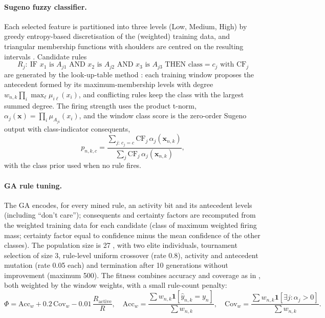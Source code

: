 \paragraph{Sugeno fuzzy classifier.} Each selected feature is partitioned into three levels (Low, Medium, High) by greedy entropy-based discretisation of the (weighted) training data, and triangular membership functions with shoulders are centred on the resulting intervals \cite{FarhadiSedehi2024a}. Candidate rules
\begin{equation}
R_j:\ \text{IF } x_1 \text{ is } A_{j1} \text{ AND } x_2 \text{ is } A_{j2} \text{ AND } x_3 \text{ is } A_{j3} \text{ THEN class} = c_j \text{ with } \mathrm{CF}_j
\end{equation}
are generated by the look-up-table method \cite{WangMendel1992}: each training window proposes the antecedent formed by its maximum-membership levels with degree $w_{n,k}\prod_i\max_\ell\mu_{i\ell}(x_i)$, and conflicting rules keep the class with the largest summed degree. The firing strength uses the product t-norm, $\alpha_j(\mathbf{x})=\prod_{i}\mu_{A_{ji}}(x_i)$, and the window class score is the zero-order Sugeno output with class-indicator consequents,
\begin{equation}
p_{n,k,c} = \frac{\sum_{j:\,c_j=c}\mathrm{CF}_j\,\alpha_j(\mathbf{x}_{n,k})}{\sum_{j}\mathrm{CF}_j\,\alpha_j(\mathbf{x}_{n,k})},
\label{eq:score}
\end{equation}
with the class prior used when no rule fires.

\paragraph{GA rule tuning.} The GA encodes, for every mined rule, an activity bit and its antecedent levels (including ``don't care''); consequents and certainty factors are recomputed from the weighted training data for each candidate (class of maximum weighted firing mass; certainty factor equal to confidence minus the mean confidence of the other classes). The population size is 27 \cite{FarhadiSedehi2024a}, with two elite individuals, tournament selection of size 3, rule-level uniform crossover (rate 0.8), activity and antecedent mutation (rate 0.05 each) and termination after 10 generations without improvement (maximum 500). The fitness combines accuracy and coverage as in \cite{FarhadiSedehi2024a}, both weighted by the window weights, with a small rule-count penalty:
\begin{equation}
\Phi = \mathrm{Acc}_w + 0.2\,\mathrm{Cov}_w - 0.01\,\frac{R_{\mathrm{active}}}{R},\quad
\mathrm{Acc}_w = \frac{\sum w_{n,k}\mathbf{1}[\hat y_{n,k}=y_n]}{\sum w_{n,k}},\quad
\mathrm{Cov}_w = \frac{\sum w_{n,k}\mathbf{1}[\exists j:\alpha_j>0]}{\sum w_{n,k}}.
\label{eq:fit}
\end{equation}

